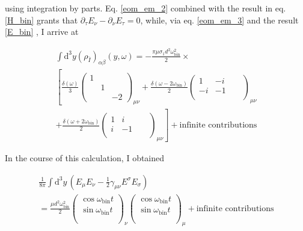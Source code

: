 \documentclass[11pt]{article}
\begin{document}
using integration by parts. Eq. \ref{eom_em_2} combined with the result in eq. \ref{H_bin} grants that $ \partial_\tau E_\nu - \partial_\nu E_\tau = 0$, while, via eq. \ref{eom_em_3} and the result \ref{E_bin} , I arrive at

\begin{multline}
	\int \mathrm{d}^3 y \left( \rho_{\bar I} \right)_{\alpha \beta}
	\left( y, \omega \right)
	=
	-\frac{\pi \mu \sigma_1 d^2 \omega^2_{\text{bin}}}{2} \times
	\\
	\left[
	\frac{\delta\left( \omega \right)}{3}
	\begin{pmatrix}
	1 & & \\ & 1 & \\ & & -2
	\end{pmatrix}_{\mu \nu}
	\right.
	+
	\frac{\delta \left( \omega - 2 \omega_{\text{bin}} \right)}{2}
	\begin{pmatrix}
	1 & -i & \\ -i & -1 & \\ & & &
	\end{pmatrix}_{\mu \nu}
	\\
	\left.
	+
	\frac{\delta \left( \omega + 2 \omega_{\text{bin}} \right)}{2}
	\begin{pmatrix}
	1 & i & \\ i & -1 & \\ & & &
	\end{pmatrix}_{\mu \nu}
	\right] + \text{infinite contributions}
\end{multline}


In the course of this calculation, I obtained 

\begin{multline} \label{usefull_result}
	\frac{1}{8 \pi} \int \mathrm{d}^3 y\,
		\left( 
		E_\mu E_\nu - \frac{1}{2} \gamma_{\mu \nu} E^\sigma E_\sigma
		\right)\\
		=
		\frac{\mu d^2 \omega_{\text{bin}}^2}{2} 
		\begin{pmatrix}
			\cos \omega_{\text{bin}} t \\
			\sin \omega_{\text{bin}} t \\
			\\
		\end{pmatrix}_{\nu}
		\begin{pmatrix}
			\cos \omega_{\text{bin}} t \\
			\sin \omega_{\text{bin}} t \\
			\\
		\end{pmatrix}_{\mu}
		+ 
		\text{infinite contributions}
\end{multline}
\end{document}
